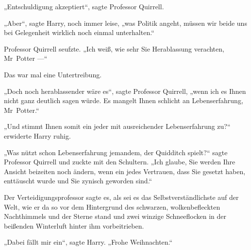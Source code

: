 „Entschuldigung akzeptiert“, sagte Professor Quirrell.

„Aber“, sagte Harry, noch immer leise, „was Politik angeht, müssen wir beide uns bei Gelegenheit wirklich noch einmal unterhalten.“


Professor Quirrell seufzte.
„Ich weiß, wie sehr Sie Herablassung verachten, Mr~Potter —“

Das war mal eine Untertreibung.

„Doch noch herablassender wäre es“, sagte Professor Quirrell, „wenn ich es Ihnen nicht ganz deutlich sagen würde. Es mangelt Ihnen schlicht an Lebenserfahrung, Mr~Potter.“

„Und stimmt Ihnen somit ein jeder mit ausreichender Lebenserfahrung zu?“ erwiderte Harry ruhig.

„Was nützt schon Lebenserfahrung jemandem, der Quidditch spielt?“ sagte Professor Quirrell und zuckte mit den Schultern.
„Ich glaube, Sie werden Ihre Ansicht beizeiten noch ändern, wenn ein jedes Vertrauen, dass Sie gesetzt haben, enttäuscht wurde und Sie zynisch geworden sind.“

Der Verteidigungsprofessor sagte es, als sei es das Selbstverständlichste auf der Welt, wie er da so vor dem Hintergrund des schwarzen, wolkenbefleckten Nachthimmels und der Sterne stand und zwei winzige Schneeflocken in der beißenden Winterluft hinter ihm vorbeitrieben.

„Dabei fällt mir ein“, sagte Harry.
„Frohe Weihnachten.“

